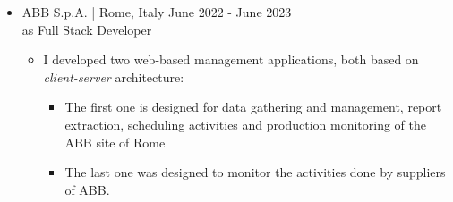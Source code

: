 \documentclass[english,10pt,a4paper]{article}
\newcommand{\Color}[1]{\textcolor{CvColor}{#1}}
\newcommand{\SubCompanyName}[1]{\textcolor{CvIcon}{{\footnotesize \textsf{#1}}}}
\newcommand{\JobTimeRange}[1]{{\scriptsize \textcolor{CvColor!50}{\faCalendar*} \hspace{0.01cm} \textcolor{CvIcon}{#1}}}
\newcommand{\CvCheck}{\textcolor{CvColor}{\faCheck}}
\begin{document}
\begin{paracol}{2}
\begin{tcolorbox}[colback=white, height=\textheight, colframe=white, left=0cm]
\begin{itemize}
{\begin{itemize}
					\begin{itemize}
						\item I participated to the development of a \textit{client-server} web application which enable users to setup and manage laser industrial machines
								
						\item I designed and developed the UI for several application sub-modules, performing several bug fixes and wrote unit tests
						
						\item I updated technical documentation
					
					\end{itemize}
					
					\textcolor{CvColor}{Acquired skills:}
					\begin{itemize}
						\item[\CvCheck] Significanlty improved knowledge about \Color{C\#}, \Color{\texttt{git}}, \Color{Azure DevOps} and \Color{Blazor}/\Color{MudBlazor}
						\item[\CvCheck] Slightly improved my confidence in spoken English and my ability to teamwork
					\end{itemize}
					
					\vspace*{0.2cm}
					\item \SubCompanyName{ABB S.p.A.} \textcolor{CvColor}{|} {\scriptsize Rome, Italy} \hfill
					\JobTimeRange{June 2022 - June 2023}\\	
					{\scriptsize \textcolor{CvIcon}{as} \textcolor{CvColor}{Full Stack Developer}}	
					
					\begin{itemize}
						
						\item I developed two web-based management applications, both based on \textit{client-server} architecture:
						\begin{itemize}
							\item The first one is designed for data gathering and management, report extraction, scheduling activities and production monitoring of the ABB site of Rome
							\item The last one was designed to monitor the activities done by suppliers of ABB.
						\end{itemize}
								

\end{itemize}
\end{itemize}}
\end{itemize}
\end{tcolorbox}
\end{paracol}
\end{document}
